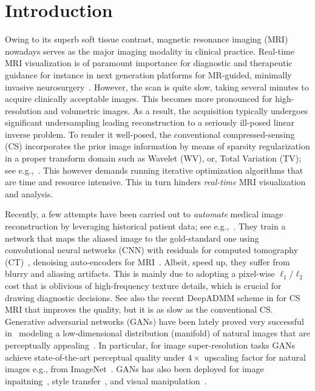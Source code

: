 \documentclass{journal}
\begin{document}
\section{Introduction}
%
Owing to its superb soft tissue contrast, magnetic resonance imaging (MRI) nowadays serves as the major imaging modality in clinical practice. Real-time MRI visualization is of paramount importance for diagnostic and therapeutic guidance for instance in next generation platforms for MR-guided, minimally invasive neurosurgery~\cite{clearpoint}. However, the scan is quite slow, taking several minutes to acquire clinically acceptable images. This becomes more pronounced for high-resolution and volumetric images. As a result, the acquisition typically undergoes significant undersampling leading reconstruction to a seriously ill-posed linear inverse problem. To render it well-posed, the conventional compressed-sensing (CS) incorporates the prior image information by means of sparsity regularization in a proper transform domain such as Wavelet (WV), or, Total Variation (TV); see e.g.,~\cite{pualy_mri20017}. This however demands running iterative optimization algorithms that are time and resource intensive. This in turn hinders {\it real-time} MRI visualization and analysis.


Recently, a few attempts have been carried out to {\it automate} medical image reconstruction by leveraging historical patient data; see e.g.,~\cite{Majumdar'15,lowdose_ct2017}. They train a network that maps the aliased image to the gold-standard one using convolutional neural networks (CNN) with residuals for computed tomography (CT)~\cite{lowdose_ct2017}, denoising auto-encoders for MRI~\cite{Majumdar'15}. Albeit, speed up, they suffer from blurry and aliasing artifacts. This is mainly due to adopting a pixel-wise $\ell_1$/$\ell_2$ cost that is oblivious of high-frequency texture details, which is crucial for drawing diagnostic decisions. See also the recent DeepADMM scheme in \cite{deepADMM2016} for CS MRI that improves the quality, but it is as slow as the conventional CS. Generative adversarial networks (GANs) have been lately proved very successful in~\cite{gan-goodfellow2014,dcgan2016} modeling a low-dimensional distribution (manifold) of natural images that are perceptually appealing~\cite{Zhu et al'16}. In particular, for image super-resolution tasks GANs achieve state-of-the-art perceptual quality under $4\times$ upscaling factor for natural images e.g., from ImageNet~\cite{leding et al'16, Sonderby et al'14}. GANs has also been deployed for image inpaitning~\cite{inpainting-yeh-2016}, style transfer~\cite{johnson2016}, and visual manipulation~\cite{Zhu et al'16}. 
\end{document}
